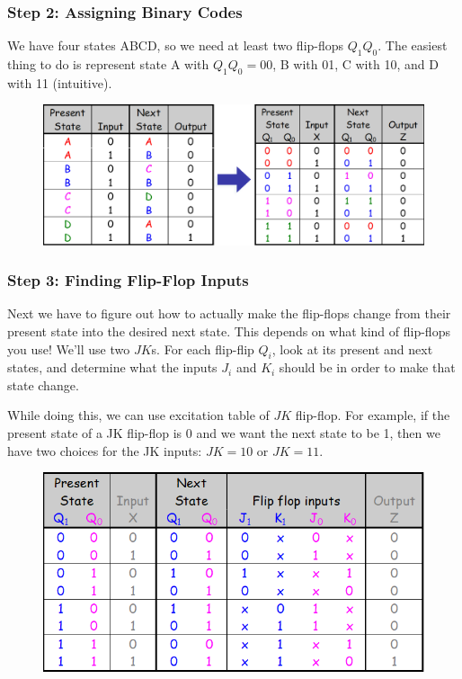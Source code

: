 \subsubsection{Step 2: Assigning Binary Codes}
\label{subsubsec:step2-assign-bin-code}

We have four states ABCD, so we need at least two flip-flops $Q_1Q_0$. The easiest thing to do is represent state A with $Q_1Q_0 = 00$, B with 01, C with 10, and D with 11 (intuitive).
\begin{figure}[H]
  \centering
  \includegraphics[width=\linewidth]{img/desing-example-state-table-2.png}
\end{figure}

\subsubsection{Step 3: Finding Flip-Flop Inputs}
\label{subsubsec:step3-finding-ff-inputs}

Next we have to figure out how to actually make the flip-flops change from their present state into the desired next state. This depends on what kind of flip-flops you use! We'll use two $JK$s. For each flip-flip $Q_i$, look at its present and next states, and determine what the inputs $J_i$ and $K_i$ should be in order to make that state change.

While doing this, we can use excitation table of $JK$ flip-flop. For example, if the present state of a JK flip-flop is 0 and we want the next state to be 1, then we have two choices for the JK inputs: $JK = 10$ or $JK = 11$.
\begin{figure}[H]
  \centering
  \includegraphics[width=\linewidth]{img/desing-example-state-table-3.png}
\end{figure}

